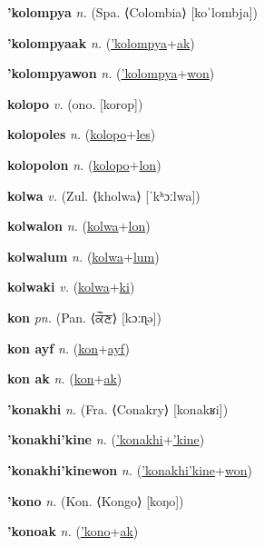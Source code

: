 \textbf{\hypertarget{'kolompya}{'kolompya}} \textit{n.} (Spa. ⟨Colombia⟩ [koˈlombja])


\textbf{\hypertarget{'kolompyaak}{'kolompyaak}} \textit{n.} (\hyperlink{'kolompya}{'kolompya}+\allowbreak \hyperlink{ak}{ak})


\textbf{\hypertarget{'kolompyawon}{'kolompyawon}} \textit{n.} (\hyperlink{'kolompya}{'kolompya}+\allowbreak \hyperlink{won}{won})


\textbf{\hypertarget{kolopo}{kolopo}} \textit{v.} (ono. [korop])


\textbf{\hypertarget{kolopoles}{kolopoles}} \textit{n.} (\hyperlink{kolopo}{kolopo}+\allowbreak \hyperlink{les}{les})


\textbf{\hypertarget{kolopolon}{kolopolon}} \textit{n.} (\hyperlink{kolopo}{kolopo}+\allowbreak \hyperlink{lon}{lon})


\textbf{\hypertarget{kolwa}{kolwa}} \textit{v.} (Zul. ⟨kholwa⟩ [ˈkʰɔːlwa])


\textbf{\hypertarget{kolwalon}{kolwalon}} \textit{n.} (\hyperlink{kolwa}{kolwa}+\allowbreak \hyperlink{lon}{lon})


\textbf{\hypertarget{kolwalum}{kolwalum}} \textit{n.} (\hyperlink{kolwa}{kolwa}+\allowbreak \hyperlink{lum}{lum})


\textbf{\hypertarget{kolwaki}{kolwaki}} \textit{v.} (\hyperlink{kolwa}{kolwa}+\allowbreak \hyperlink{ki}{ki})


\textbf{\hypertarget{kon}{kon}} \textit{pn.} (Pan. ⟨{\gurmukhi{}ਕੌਣ}⟩ [kɔːɳə])


\textbf{\hypertarget{kon ayf}{kon ayf}} \textit{n.} (\hyperlink{kon}{kon}+\allowbreak \hyperlink{ayf}{ayf})


\textbf{\hypertarget{kon ak}{kon ak}} \textit{n.} (\hyperlink{kon}{kon}+\allowbreak \hyperlink{ak}{ak})


\textbf{\hypertarget{'konakhi}{'konakhi}} \textit{n.} (Fra. ⟨Conakry⟩ [konakʁi])


\textbf{\hypertarget{'konakhi'kine}{'konakhi'kine}} \textit{n.} (\hyperlink{'konakhi}{'konakhi}+\allowbreak \hyperlink{'kine}{'kine})


\textbf{\hypertarget{'konakhi'kinewon}{'konakhi'kinewon}} \textit{n.} (\hyperlink{'konakhi'kine}{'konakhi'kine}+\allowbreak \hyperlink{won}{won})


\textbf{\hypertarget{'kono}{'kono}} \textit{n.} (Kon. ⟨Kongo⟩ [koŋo])


\textbf{\hypertarget{'konoak}{'konoak}} \textit{n.} (\hyperlink{'kono}{'kono}+\allowbreak \hyperlink{ak}{ak})


